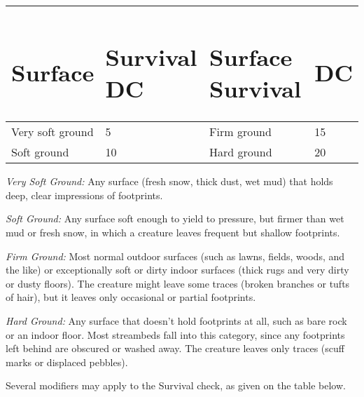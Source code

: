 \documentclass{article}
\begin{document}
\vspace{12pt}
\begin{tabular}{|>{\raggedright}p{67pt}|>{\raggedright}p{51pt}|>{\raggedright}p{70pt}|>{\raggedright}p{13pt}|}
\hline
\section*{S\textbf{urface}} & \section*{S\textbf{urvival DC }} & \section*{S\textbf{urface 
Survival }} & \section*{D\textbf{C}}\tabularnewline
\hline
Very soft ground  & 5  & Firm ground  & 15\tabularnewline
\hline
Soft ground  & 10  & Hard ground  & 20\tabularnewline
\hline
\end{tabular}

\vspace{12pt}
\textit{Very Soft Ground: }Any surface (fresh snow, thick dust, wet mud) that holds 
deep, clear impressions of footprints.

\textit{Soft Ground: }Any surface soft enough to yield to pressure, but firmer 
than wet mud or fresh snow, in which a creature leaves frequent but shallow footprints.

\textit{Firm Ground: }Most normal outdoor surfaces (such as lawns, fields, woods, 
and the like) or exceptionally soft or dirty indoor surfaces (thick rugs and very 
dirty or dusty floors). The creature might leave some traces (broken branches or 
tufts of hair), but it leaves only occasional or partial footprints.

\textit{Hard Ground: }Any surface that doesn't hold footprints at all, such as 
bare rock or an indoor floor. Most streambeds fall into this category, since any 
footprints left behind are obscured or washed away. The creature leaves only traces 
(scuff marks or displaced pebbles). 

Several modifiers may apply to the Survival check, as given on the table below.
\end{document}
